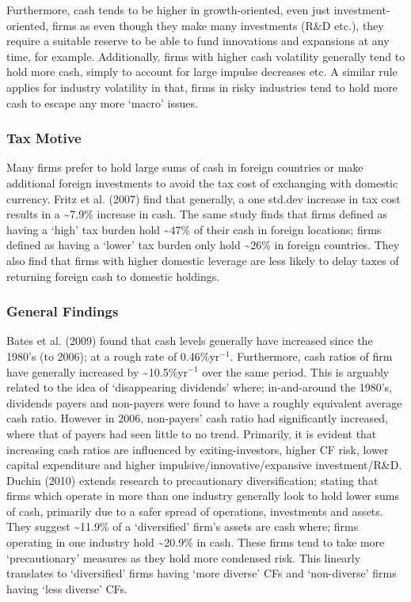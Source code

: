 \documentclass[11pt, english]{article}
\begin{document}
	Furthermore, cash tends to be higher in growth-oriented, even just investment- oriented, firms as even though they make many investments (R\&D etc.), they require a suitable reserve to be able to fund innovations and expansions at any time, for example. Additionally, firms with higher cash volatility generally tend to hold more cash, simply to account for large impulse decreases etc. A similar rule applies for industry volatility in that, firms in risky industries tend to hold more cash to escape any more ‘macro’ issues.

		\subsubsection*{Tax Motive}

	Many firms prefer to hold large sums of cash in foreign countries or make additional foreign investments to avoid the tax cost of exchanging with domestic currency. Fritz et al. (2007) find that generally, a one std.dev increase in tax cost results in a \~{}7.9\% increase in cash. The same study finds that firms defined as having a ‘high’ tax burden hold \~{}47\% of their cash in foreign locations; firms defined as having a ‘lower’ tax burden only hold \~{}26\% in foreign countries. They also find that firms with higher domestic leverage are less likely to delay taxes of returning foreign cash to domestic holdings.

		\subsubsection*{General Findings}

	Bates et al. (2009) found that cash levels generally have increased since the 1980’s (to 2006); at a rough rate of 0.46\%yr$^{-1}$. Furthermore, cash ratios of firm have generally increased by \~{}10.5\%yr$^{-1}$ over the same period. This is arguably related to the idea of ‘disappearing dividends’ where; in-and-around the 1980’s, dividends payers and non-payers were found to have a roughly equivalent average cash ratio. However in 2006, non-payers’ cash ratio had significantly increased, where that of payers had seen little to no trend. Primarily, it is evident that increasing cash ratios are influenced by exiting-investors, higher CF risk, lower capital expenditure and higher impulsive/innovative/expansive investment/R\&D.\\

	Duchin (2010) extends research to precautionary diversification; stating that firms which operate in more than one industry generally look to hold lower sums of cash, primarily due to a safer spread of operations, investments and assets. They suggest \~{}11.9\% of a ‘diversified’ firm’s assets are cash where; firms operating in one industry hold \~{}20.9\% in cash. These firms tend to take more ‘precautionary’ measures as they hold more condensed risk. This linearly translates to ‘diversified’ firms having ‘more diverse’ CFs and ‘non-diverse’ firms having ‘less diverse’ CFs.\\
\end{document}
